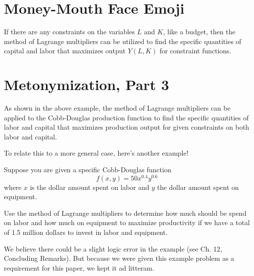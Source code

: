 \chapter{Money-Mouth Face Emoji}
If there are any constraints on the variables $L$ and $K$, like a budget, then the method of Lagrange multipliers can be utilized to find the specific quantities of capital and labor that maximizes output $Y(L, K)$ for constraint functions.
\setcounter{chapter}{10}
\chapter{Metonymization, Part 3}
As shown in the above example, the method of Lagrange multipliers can be applied to the Cobb-Douglas production function to find the specific quantities of labor and capital that maximizes production output for given constraints on both labor and capital.

To relate this to a more general case, here's another example!
\begin{eg}
	Suppose you are given a specific Cobb-Douglas function \[f(x, y) = 50x^{0.4}y^{0.6}\] where $x$ is the dollar amount spent on labor and $y$ the dollar amount spent on equipment.
	
	Use the method of Lagrange multipliers to determine how much should be spend on labor and how much on equipment to maximize productivity if we have a total of 1.5 million dollars to invest in labor and equipment.
	
	We believe there could be a slight logic error in the example (see Ch. 12, Concluding Remarks). But because we were given this example problem as a requirement for this paper, we kept it ad litteram.
\end{eg}